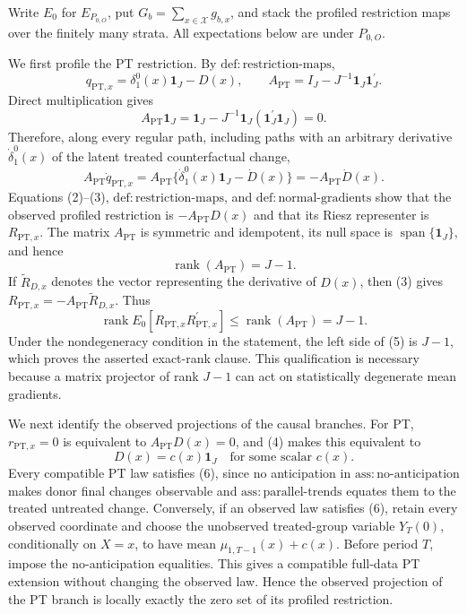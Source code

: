 Write \(E_0\) for \(E_{P_{0,O}}\), put \(G_b=\sum_{x\in\mathcal X}g_{b,x}\), and stack the profiled restriction maps over the finitely many strata.  All expectations below are under \(P_{0,O}\).

We first profile the PT restriction.  By \(\mathrm{def{:}restriction\text{-}maps}\),
\[
 q_{\mathrm{PT},x}=\delta_1^0(x)\mathbf 1_J-D(x),
 \qquad
 A_{\mathrm{PT}}=I_J-J^{-1}\mathbf 1_J\mathbf 1_J^{\prime}.
 \tag{1}
\]
Direct multiplication gives
\[
 A_{\mathrm{PT}}\mathbf 1_J
 =\mathbf 1_J-J^{-1}\mathbf 1_J(\mathbf 1_J^{\prime}\mathbf 1_J)
 =0.
 \tag{2}
\]
Therefore, along every regular path, including paths with an arbitrary derivative \(\dot\delta_1^0(x)\) of the latent treated counterfactual change,
\[
 A_{\mathrm{PT}}\dot q_{\mathrm{PT},x}
 =A_{\mathrm{PT}}\{\dot\delta_1^0(x)\mathbf 1_J-\dot D(x)\}
 =-A_{\mathrm{PT}}\dot D(x).
 \tag{3}
\]
Equations (2)--(3), \(\mathrm{def{:}restriction\text{-}maps}\), and \(\mathrm{def{:}normal\text{-}gradients}\) show that the observed profiled restriction is \(-A_{\mathrm{PT}}D(x)\) and that its Riesz representer is \(R_{\mathrm{PT},x}\).  The matrix \(A_{\mathrm{PT}}\) is symmetric and idempotent, its null space is \(\operatorname{span}\{\mathbf 1_J\}\), and hence
\[
 \operatorname{rank}(A_{\mathrm{PT}})=J-1.
 \tag{4}
\]
If \(\widetilde R_{D,x}\) denotes the vector representing the derivative of \(D(x)\), then (3) gives \(R_{\mathrm{PT},x}=-A_{\mathrm{PT}}\widetilde R_{D,x}\).  Thus
\[
 \operatorname{rank}E_0[R_{\mathrm{PT},x}R_{\mathrm{PT},x}^{\prime}]
 \le \operatorname{rank}(A_{\mathrm{PT}})=J-1.
 \tag{5}
\]
Under the nondegeneracy condition in the statement, the left side of (5) is \(J-1\), which proves the asserted exact-rank clause.  This qualification is necessary because a matrix projector of rank \(J-1\) can act on statistically degenerate mean gradients.

We next identify the observed projections of the causal branches.  For PT, \(r_{\mathrm{PT},x}=0\) is equivalent to \(A_{\mathrm{PT}}D(x)=0\), and (4) makes this equivalent to
\[
 D(x)=c(x)\mathbf 1_J
 \quad\text{for some scalar }c(x).
 \tag{6}
\]
Every compatible PT law satisfies (6), since no anticipation in \(\mathrm{ass{:}no\text{-}anticipation}\) makes donor final changes observable and \(\mathrm{ass{:}parallel\text{-}trends}\) equates them to the treated untreated change.  Conversely, if an observed law satisfies (6), retain every observed coordinate and choose the unobserved treated-group variable \(Y_T(0)\), conditionally on \(X=x\), to have mean \(\mu_{1,T-1}(x)+c(x)\).  Before period \(T\), impose the no-anticipation equalities.  This gives a compatible full-data PT extension without changing the observed law.  Hence the observed projection of the PT branch is locally exactly the zero set of its profiled restriction.


